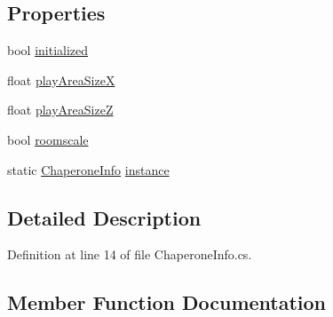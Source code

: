 \subsection*{Properties}
\begin{DoxyCompactItemize}
\item 
bool \mbox{\hyperlink{class_valve_1_1_v_r_1_1_interaction_system_1_1_chaperone_info_a284c130f90d6b034c43357a856ded3c3}{initialized}}
\item 
float \mbox{\hyperlink{class_valve_1_1_v_r_1_1_interaction_system_1_1_chaperone_info_ad47617eaad71a9ca6faa4680e1bc79c2}{play\+Area\+SizeX}}
\item 
float \mbox{\hyperlink{class_valve_1_1_v_r_1_1_interaction_system_1_1_chaperone_info_a6101a395253f74ad23a7063e0771c5d5}{play\+Area\+SizeZ}}
\item 
bool \mbox{\hyperlink{class_valve_1_1_v_r_1_1_interaction_system_1_1_chaperone_info_aa60aa40b735bf1aedf4ab9a88c55da79}{roomscale}}
\item 
static \mbox{\hyperlink{class_valve_1_1_v_r_1_1_interaction_system_1_1_chaperone_info}{Chaperone\+Info}} \mbox{\hyperlink{class_valve_1_1_v_r_1_1_interaction_system_1_1_chaperone_info_acfefbdec37d6d35e773fe30342077c1b}{instance}}
\end{DoxyCompactItemize}


\subsection{Detailed Description}


Definition at line 14 of file Chaperone\+Info.\+cs.



\subsection{Member Function Documentation}
\mbox{\label{class_valve_1_1_v_r_1_1_interaction_system_1_1_chaperone_info_a67077285a9b36c0dd9c3ea1e8357bd24}} 
